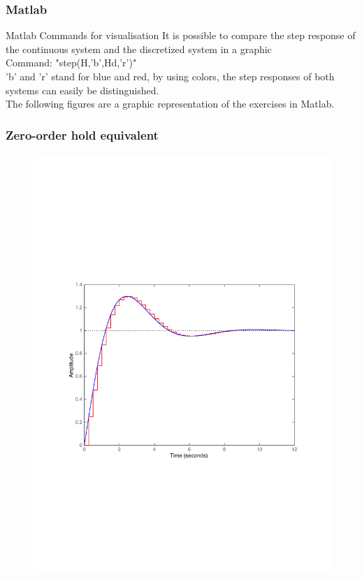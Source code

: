 \begin{frame}
	\frametitle{Matlab}
	\begin{block}{Matlab Commands for visualisation}
		It is possible to compare the step response of the continuous system and the discretized system in a graphic\\
		\vspace{1em}
		Command: "step(H,'b',Hd,'r')"\\
		\vspace{1em}
		'b' and 'r' stand for blue and red, by using colors, the step responses of both systems can easily be distinguished.\\
		\vspace{1em}
		The following figures are a graphic representation of the exercises in Matlab.
	\end{block}
\end{frame}

\begin{frame}
	\frametitle{Zero-order hold equivalent}
	\vspace{-0.7em}
	\begin{figure}
		\centering
		\includegraphics[width=0.85\linewidth]{vb1}
	\end{figure}
\end{frame}

